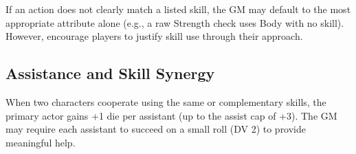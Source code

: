 If an action does not clearly match a listed skill, the GM may default to the most appropriate attribute alone (e.g., a raw Strength check uses Body with no skill). However, encourage players to justify skill use through their approach.

\subsection{Assistance and Skill Synergy}

When two characters cooperate using the same or complementary skills, the primary actor gains +1 die per assistant (up to the assist cap of +3). The GM may require each assistant to succeed on a small roll (DV 2) to provide meaningful help.

